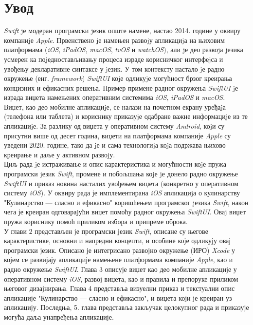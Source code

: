 \documentclass[12pt,oneside]{memoir}
\begin{document}
\frontmatter
\naslovna
\komisija
\apstrakt
\tableofcontents*

\mainmatter

\chapter{Увод}

\indent \textit{Swift} jе модеран програмски jезик опште намене, настао 2014. године у оквиру компаниjе \textit{Apple}. Првенствено jе намењен развоjу апликациjа на њиховим платформама (\textit{iOS}, \textit{iPadOS}, \textit{macOS}, \textit{tvOS} и \textit{watchOS}), али jе део развоjа jезика усмерен ка поjедностављивању процеса израде корисничког интерфеjса и увођењу декларативне синтаксе у jезик. У том контексту настало jе радно окружење (енг. \textit{framework}) \textit{SwiftUI} коjе одликуjе могућност брзог креирања концизних и ефикасних решења. Пример примене радног окружења \textit{SwiftUI} jе израда виџета намењених оперативним системима \textit{iOS}, \textit{iPadOS} и \textit{macOS}. 
\\
\indent Виџет, као део мобилне апликациjе, се налази на почетном екрану уређаjа (телефона или таблета) и кориснику приказуjе одабране важне информациjе из те апликациjе. За разлику од виџета у оперативном систему \textit{Android}, коjи су присутни више од десет година, виџети на платформама компаније \textit{Apple} су уведени 2020. године, тако да jе и сама технологиjа коjа подржава њихово креирање и даље у активном развоjу.
\\
\indent Циљ рада jе истраживање и опис карактеристика и могућности коjе пружа програмски jезик \textit{Swift}, промене и побољшања коjе jе донело радно окружење \textit{SwiftUI} и приказ новина насталих увођењем виџета (конкретно у оперативном систему \textit{iOS}). У оквиру рада је имплементирана \textit{iOS} апликациjа о кулинарству "Кулинарство --- сласно и ефикасно" коришћењем програмског jезика \textit{Swift}, након чега је креиран одговараjући виџет помоћу радног окружења \textit{SwiftUI}. Оваj виџет пружа кориснику помоћ приликом избора и припреме оброка.
\\
\indent У глави 2 представљен је програмски језик \textit{Swift}, описане су његове карактеристике, основни и напредни концепти, и особине које одликују овај програмски језик. Описано је интегрисано развојно окружење (ИРО) \textit{Xcode} у којем се развијају апликације намењене платформама компаније \textit{Apple}, као и радно окружење \textit{SwiftUI}. Глава 3 описује виџет као део мобилне апликације у оперативном систему \textit{iOS}, развој виџета, као и правила и препоруке приликом његовог дизајнирања. Глава 4 представља визуелни приказ и текстуални опис апликације "Кулинарство --- сласно и ефикасно", и виџета који је креиран уз апликацију. Последња, 5. глава представља закључак целокупног рада и приказује могућа даља унапређења апликације.
\end{document}
